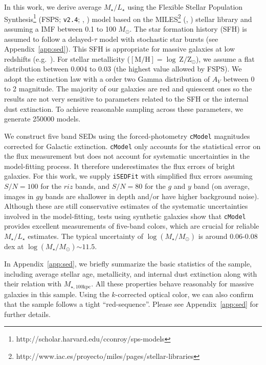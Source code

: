 \documentclass[a4paper,fleqn,usenatbib]{mnras}
\def\msun{$M_\odot$}
\def\cmodel{\texttt{cModel}}
\def\logms{{$\log (M_{\star}/M_{\odot})$}}
\def\mtot{{$M_{\star,100\mathrm{kpc}}$}}
\def\m2l{{$M_{\star}/L_{\star}$}}
\begin{document}
    In this work, we derive average \m2l{} using the Flexible Stellar Population 
    Synthesis\footnote{http://scholar.harvard.edu/cconroy/sps-models}
    (FSPS; \texttt{v2.4}; \citealt{FSPS}, \citealt{Conroy2010}) model based on the 
    MILES\footnote{http://www.iac.es/proyecto/miles/pages/stellar-libraries}
    (\citealt{MILES1}, \citealt{MILES2}) stellar library and assuming a
    \citet{Chabrier2003} IMF between 0.1 to 100 \msun. 
    The star formation history (SFH) is assumed to follow a delayed-$\tau$ model with 
    stochastic star bursts (see Appendix~\ref{app:sed}). 
    This SFH is appropriate for massive galaxies at low redshifts 
    (e.g.\ \citealt{Kauffmann2003}). 
    For stellar metallicity 
    ($[\mathrm{M}/\mathrm{H}]=\log\ \mathrm{Z}/\mathrm{Z}_{\odot}$), we assume a flat 
    distribution between 0.004 to 0.03 (the highest value allowed by FSPS).
    We adopt the \citet{Calzetti2000} extinction law with a order two Gamma 
    distribution of $A_{V}$ between 0 to 2 magnitude. 
    The majority of our galaxies are red and quiescent ones so the results are not 
    very sensitive to parameters related to the SFH or the internal dust extinction. 
    To achieve reasonable sampling across these parameters, we generate 250000 models. 
    
    We construct five band SEDs using the forced-photometry \cmodel{} magnitudes 
    corrected for Galactic extinction. 
    \cmodel{} only accounts for the statistical error on the flux measurement but 
    does not account for systematic uncertainties in the model-fitting process. 
    It therefore underestimates the flux errors of bright galaxies. 
    For this work, we supply \texttt{iSEDFit} with simplified flux errors assuming 
    $S/N = 100$ for the $riz$ bands, and $S/N = 80$ for the $g$ and $y$ band 
    (on average, images in $gy$ bands are shallower in depth and/or have higher 
    background noise).  
    Although these are still conservative estimates of the systematic uncertainties 
    involved in the model-fitting, tests using synthetic galaxies show that \cmodel{}
    provides excellent measurements of five-band colors, which are crucial for 
    reliable \m2l{} estimates.
    The typical uncertainty of \logms{} is around 0.06-0.08 dex at \logms${\sim} 11.5$.
    
    In Appendix~\ref{app:sed}, we briefly summarize the basic statistics of 
    the sample, including average stellar age, metallicity, and internal dust 
    extinction along with their relation with \mtot{}. 
    All these properties behave reasonably for massive galaxies in this sample. 
    Using the $k$-corrected optical color, we can also confirm that the sample follows 
    a tight ``red-sequence''.  
    Please see Appendix~\ref{app:sed} for further details.
      
\end{document}
